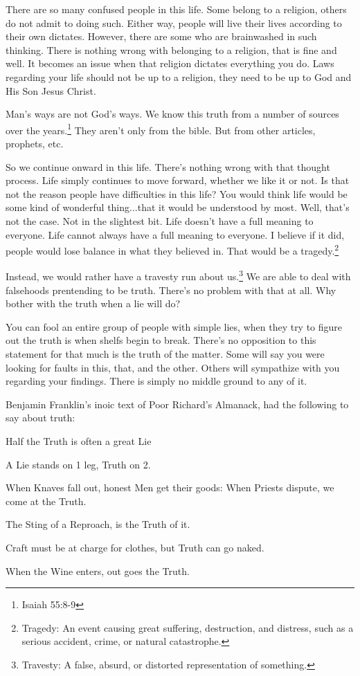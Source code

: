 There are so many confused people in this life. Some belong to a religion,
others do not admit to doing such. Either way, people will live their lives
according to their own dictates. However, there are some who are brainwashed in
such thinking. There is nothing wrong with belonging to a religion, that is fine
and well. It becomes an issue when that religion dictates everything you do.
Laws regarding your life should not be up to a religion, they need to be up to
God and His Son Jesus Christ.

Man's ways are not God's ways. We know this truth from a number of sources over
the years.\footnote{Isaiah 55:8-9} They aren't only from the bible. But from
other articles, prophets, etc.

So we continue onward in this life. There's nothing wrong with that thought
process. Life simply continues to move forward, whether we like it or not. Is
that not the reason people have difficulties in this life? You would think life
would be some kind of wonderful thing...that it would be understood by most.
Well, that's not the case. Not in the slightest bit. Life doesn't have a full
meaning to everyone. Life cannot always have a full meaning to everyone. I
believe if it did, people would lose balance in what they believed in. That
would be a tragedy.\footnote{Tragedy: An event causing great suffering, 
destruction, and distress, such as a serious accident, crime, or natural 
catastrophe.}

Instead, we would rather have a travesty run about us.\footnote{Travesty: A 
false, absurd, or distorted representation of something.} We are able to deal
with falsehoods prentending to be truth. There's no problem with that at all.
Why bother with the truth when a lie will do?

You can fool an entire group of people with simple lies, when they try to figure
out the truth is when shelfs begin to break. There's no opposition to this
statement for that much is the truth of the matter. Some will say you were
looking for faults in this, that, and the other. Others will sympathize with you
regarding your findings. There is simply no middle ground to any of it.

Benjamin Franklin's inoic text of Poor Richard's Almanack, had the following to
say about truth:

\begin{displayquote}
Half the Truth is often a great Lie

A Lie stands on 1 leg, Truth on 2.

When Knaves fall out, honest Men get their goods: When Priests dispute, we 
come at the Truth.

The Sting of a Reproach, is the Truth of it.

Craft must be at charge for clothes, but Truth can go naked.

When the Wine enters, out goes the Truth.\cite{franklin}
\end{displayquote}

